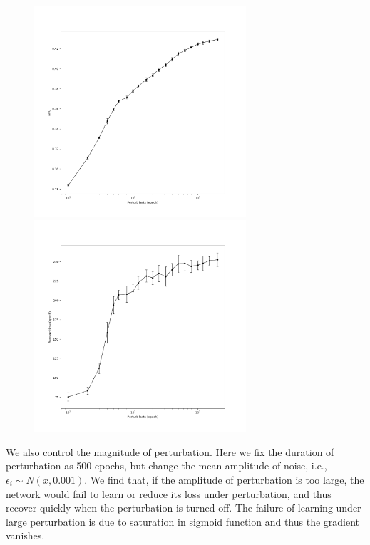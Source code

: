 \documentclass[12pt, a4paper]{article}
\begin{document}
\begin{figure}[H]
    \centering
    \includegraphics[width=0.7\textwidth]{baseline_abb05/fig/0214_abb05_perturb_auc.png} \\
    \includegraphics[width=0.7\textwidth]{baseline_abb05/fig/0214_abb05_perturb_rectime.png}
\end{figure}

\newpage

We also control the magnitude of perturbation. Here we fix the duration of perturbation as 500 epochs, but change the mean amplitude of noise, i.e., $\epsilon_i \sim N(x, 0.001)$. We find that, if the amplitude of perturbation is too large, the network would fail to learn or reduce its loss under perturbation, and thus recover quickly when the perturbation is turned off. The failure of learning under large perturbation is due to saturation in sigmoid function and thus the gradient vanishes.
\end{document}
